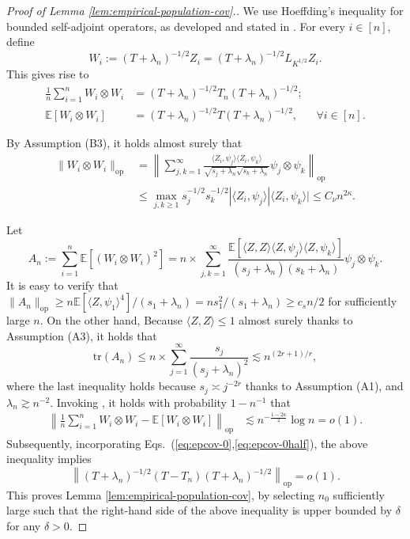 \documentclass[11pt,a4paper]{article}
\newcommand{\tr}{\mathrm{tr}}
\theoremstyle{definition}
\theoremstyle{plain}
\theoremstyle{remark}
\newcommand{\op}{\mathrm{op}}
\begin{document}
\begin{proof}[Proof of Lemma \ref{lem:empirical-population-cov}.]
We use Hoeffding's inequality for bounded self-adjoint operators, as developed and stated in \citep{minsker2017some}.
For every $i\in[n]$, define
$$
W_i := (T+\lambda_n)^{-1/2}Z_i = (T+\lambda_n)^{-1/2}L_{K^{1/2}}Z_i.
$$
This gives rise to
\begin{align}
\frac{1}{n}\sum_{i=1}^n W_i\otimes W_i &= (T+\lambda_n )^{-1/2}T_n (T+\lambda_n )^{-1/2};\label{eq:epcov-0}\\
\mathbb E[W_i\otimes W_i] &= (T+\lambda_n)^{-1/2} T (T+\lambda_n )^{-1/2}, \;\;\;\;\;\;\forall i\in[n]\label{eq:epcov-0half}.
\end{align}

By Assumption (B3), it holds almost surely that 
\begin{align}
\|W_i\otimes W_i\|_\op&=\left\|\sum_{j,k=1}^{\infty}\frac{\langle Z_i,\psi_j\rangle\langle Z_i,\psi_k\rangle}{\sqrt{s_j+\lambda_n}\sqrt{s_k+\lambda_n}}\psi_j\otimes\psi_k\right\|_\op\nonumber\\
&\leq \max_{j,k\geq 1}s_j^{-1/2}s_k^{-1/2}|\langle Z_i,\psi_j\rangle|\langle Z_i,\psi_k\rangle|\leq C_\nu n^{2\kappa}.
\label{eq:proof-epcov-1}
\end{align}

Let 
$$
A_n := \sum_{i=1}^n\mathbb E[(W_i\otimes W_i)^2] =n\times\sum_{j,k=1}^{\infty}\frac{\mathbb E[\langle Z,Z\rangle\langle Z,\psi_j\rangle\langle Z,\psi_k\rangle]}{(s_j+\lambda_n)(s_k+\lambda_n)}\psi_j\otimes \psi_k.
$$
It is easy to verify that $\|A_n\|_\op \geq n\mathbb E[\langle Z,\psi_1\rangle^4]/(s_1+\lambda_n)=ns_1^2/(s_1+\lambda_n)\geq c_sn/2$ for sufficiently large $n$. 
On the other hand, Because $\langle Z,Z\rangle\leq 1$ almost surely thanks to Assumption (A3), it holds that
\begin{equation}
\tr(A_n) \leq n\times \sum_{j=1}^{\infty} \frac{s_j}{(s_j+\lambda_n)^2} \lesssim n^{(2r+1)/r},
\label{eq:proof-epcov-2}
\end{equation}
where the last inequality holds because $s_j\asymp j^{-2r}$ thanks to Assumption (A1), and $\lambda_n\gtrsim n^{-2}$.
Invoking \citep[Theorem 3.1]{minsker2017some}, it holds with probability $1-n^{-1}$ that
\begin{align*}
\left\|\frac{1}{n}\sum_{i=1}^n W_i\otimes W_i-\mathbb E[W_i\otimes W_i]\right\|_\op &\lesssim n^{-\frac{1-2\kappa}{2}}\log n = o(1). 
\end{align*}
Subsequently, incorporating Eqs.~(\ref{eq:epcov-0},\ref{eq:epcov-0half}), the above inequality implies
$$
\left\|(T+\lambda_n)^{-1/2}(T-T_n)(T+\lambda_n)^{-1/2}\right\|_\op = o(1).
$$
This proves Lemma \ref{lem:empirical-population-cov}, by selecting $n_0$ sufficiently large such that the right-hand side of the above inequality is upper bounded by $\delta$ for any $\delta>0$.
\end{proof}
\end{document}
